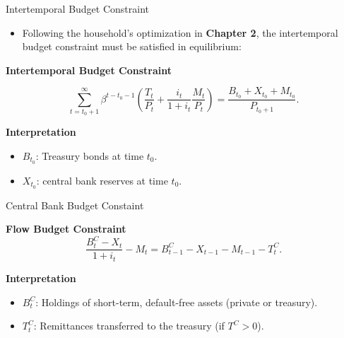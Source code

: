 \documentclass[11pt,aspectratio=169]{beamer}
\begin{document}
\begin{frame}{Intertemporal Budget Constraint}
\small
\begin{itemize}
    \item Following the household's optimization in \textbf{Chapter 2}, the intertemporal budget constraint must be satisfied in equilibrium:
\end{itemize}
\vspace{0.3cm}
\textbf{Intertemporal Budget Constraint}

\begin{equation}
\sum_{t=t_{0}+1}^{\infty }\beta ^{t-t_{0}-1}\left( \frac{T_{t}}{P_{t}}+\frac{i_{t}}{1+i_{t}}\frac{M_{t}}{P_{t}}\right) =\frac{B_{t_{0}}+X_{t_{0}}+M_{t_{0}}}{P_{t_{0}+1}}.  \label{IBC-L}
\end{equation}

\vspace{0.4cm}
\textbf{Interpretation}
\begin{itemize}
    \item $B_{t_0}$: Treasury bonds at time $t_0$.
    \item $X_{t_0}$: central bank  reserves at time $t_0$.
\end{itemize}
\end{frame}

\begin{frame}{Central Bank Budget Constaint}
\small

\textbf{Flow Budget Constraint}
\begin{equation}
\frac{B_{t}^{C}-X_{t}}{1+i_{t}}-M_{t}=B_{t-1}^{C}-X_{t-1}-M_{t-1}-T_{t}^{C}.
\label{BudgetC-L}
\end{equation}

\vspace{0.4cm}

\textbf{Interpretation}
\begin{itemize}
    \item $B_{t}^{C}$: Holdings of short-term, default-free assets (private or treasury).
    \item $T_{t}^{C}$: Remittances transferred to the treasury (if $T^C > 0$).
\end{itemize}
\end{frame}
\end{document}
